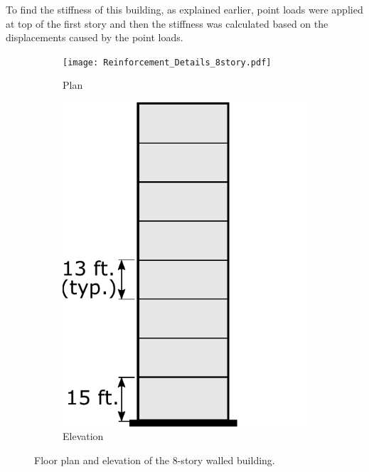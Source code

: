 \documentclass[onecolumn, fleqn]{article}
\begin{document}
To find the stiffness of this building, as explained earlier, point loads were applied at top of the first story and then the stiffness was calculated based on the displacements caused by the point loads.

\begin{figure}[H]
	\begin{subfigure}[b]{0.7\linewidth}
		\centering \texttt{[image: Reinforcement\_Details\_8story.pdf]}
		\caption{Plan}	
	\end{subfigure}
	\begin{subfigure}[b]{0.25\linewidth}
		\centering \includegraphics[scale=0.5]{bldg_elevations.pdf}
		\caption{Elevation}
	\end{subfigure}
	\caption{Floor plan and elevation of the 8-story walled building.}
	\label{fig:8_floor_plan}
\end{figure}
\end{document}
